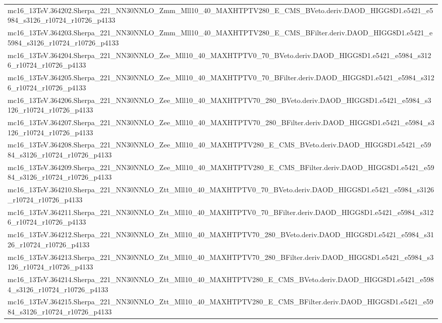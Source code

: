 \begin{adjustwidth}{-3em}{-3em}
\begin{longtable}{l}
mc16\_13TeV.364202.Sherpa\_221\_NN30NNLO\_Zmm\_Mll10\_40\_MAXHTPTV280\_E\_CMS\_BVeto.deriv.DAOD\_HIGG8D1.e5421\_e5984\_s3126\_r10724\_r10726\_p4133 \\
mc16\_13TeV.364203.Sherpa\_221\_NN30NNLO\_Zmm\_Mll10\_40\_MAXHTPTV280\_E\_CMS\_BFilter.deriv.DAOD\_HIGG8D1.e5421\_e5984\_s3126\_r10724\_r10726\_p4133 \\
mc16\_13TeV.364204.Sherpa\_221\_NN30NNLO\_Zee\_Mll10\_40\_MAXHTPTV0\_70\_BVeto.deriv.DAOD\_HIGG8D1.e5421\_e5984\_s3126\_r10724\_r10726\_p4133 \\
mc16\_13TeV.364205.Sherpa\_221\_NN30NNLO\_Zee\_Mll10\_40\_MAXHTPTV0\_70\_BFilter.deriv.DAOD\_HIGG8D1.e5421\_e5984\_s3126\_r10724\_r10726\_p4133 \\
mc16\_13TeV.364206.Sherpa\_221\_NN30NNLO\_Zee\_Mll10\_40\_MAXHTPTV70\_280\_BVeto.deriv.DAOD\_HIGG8D1.e5421\_e5984\_s3126\_r10724\_r10726\_p4133 \\
mc16\_13TeV.364207.Sherpa\_221\_NN30NNLO\_Zee\_Mll10\_40\_MAXHTPTV70\_280\_BFilter.deriv.DAOD\_HIGG8D1.e5421\_e5984\_s3126\_r10724\_r10726\_p4133 \\
mc16\_13TeV.364208.Sherpa\_221\_NN30NNLO\_Zee\_Mll10\_40\_MAXHTPTV280\_E\_CMS\_BVeto.deriv.DAOD\_HIGG8D1.e5421\_e5984\_s3126\_r10724\_r10726\_p4133 \\
mc16\_13TeV.364209.Sherpa\_221\_NN30NNLO\_Zee\_Mll10\_40\_MAXHTPTV280\_E\_CMS\_BFilter.deriv.DAOD\_HIGG8D1.e5421\_e5984\_s3126\_r10724\_r10726\_p4133 \\
mc16\_13TeV.364210.Sherpa\_221\_NN30NNLO\_Ztt\_Mll10\_40\_MAXHTPTV0\_70\_BVeto.deriv.DAOD\_HIGG8D1.e5421\_e5984\_s3126\_r10724\_r10726\_p4133 \\
mc16\_13TeV.364211.Sherpa\_221\_NN30NNLO\_Ztt\_Mll10\_40\_MAXHTPTV0\_70\_BFilter.deriv.DAOD\_HIGG8D1.e5421\_e5984\_s3126\_r10724\_r10726\_p4133 \\
mc16\_13TeV.364212.Sherpa\_221\_NN30NNLO\_Ztt\_Mll10\_40\_MAXHTPTV70\_280\_BVeto.deriv.DAOD\_HIGG8D1.e5421\_e5984\_s3126\_r10724\_r10726\_p4133 \\
mc16\_13TeV.364213.Sherpa\_221\_NN30NNLO\_Ztt\_Mll10\_40\_MAXHTPTV70\_280\_BFilter.deriv.DAOD\_HIGG8D1.e5421\_e5984\_s3126\_r10724\_r10726\_p4133 \\
mc16\_13TeV.364214.Sherpa\_221\_NN30NNLO\_Ztt\_Mll10\_40\_MAXHTPTV280\_E\_CMS\_BVeto.deriv.DAOD\_HIGG8D1.e5421\_e5984\_s3126\_r10724\_r10726\_p4133 \\
mc16\_13TeV.364215.Sherpa\_221\_NN30NNLO\_Ztt\_Mll10\_40\_MAXHTPTV280\_E\_CMS\_BFilter.deriv.DAOD\_HIGG8D1.e5421\_e5984\_s3126\_r10724\_r10726\_p4133 \\

\end{longtable}
\end{adjustwidth}
